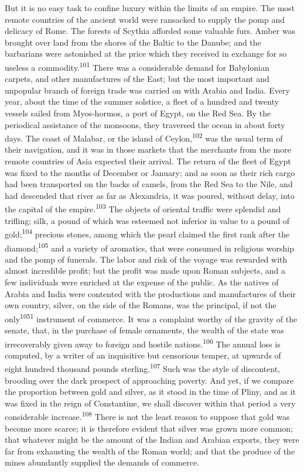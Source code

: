 But it is no easy task to confine luxury within the limits of an
empire. The most remote countries of the ancient world were
ransacked to supply the pomp and delicacy of Rome. The forests of
Scythia afforded some valuable furs. Amber was brought over land
from the shores of the Baltic to the Danube; and the barbarians
were astonished at the price which they received in exchange for
so useless a commodity.\textsuperscript{101} There was a considerable demand for
Babylonian carpets, and other manufactures of the East; but the
most important and unpopular branch of foreign trade was carried
on with Arabia and India. Every year, about the time of the
summer solstice, a fleet of a hundred and twenty vessels sailed
from Myos-hormos, a port of Egypt, on the Red Sea. By the
periodical assistance of the monsoons, they traversed the ocean
in about forty days. The coast of Malabar, or the island of
Ceylon,\textsuperscript{102} was the usual term of their navigation, and it was in
those markets that the merchants from the more remote countries
of Asia expected their arrival. The return of the fleet of Egypt
was fixed to the months of December or January; and as soon as
their rich cargo had been transported on the backs of camels,
from the Red Sea to the Nile, and had descended that river as far
as Alexandria, it was poured, without delay, into the capital of
the empire.\textsuperscript{103} The objects of oriental traffic were splendid and
trifling; silk, a pound of which was esteemed not inferior in
value to a pound of gold;\textsuperscript{104} precious stones, among which the
pearl claimed the first rank after the diamond;\textsuperscript{105} and a variety
of aromatics, that were consumed in religious worship and the
pomp of funerals. The labor and risk of the voyage was rewarded
with almost incredible profit; but the profit was made upon Roman
subjects, and a few individuals were enriched at the expense of
the public. As the natives of Arabia and India were contented
with the productions and manufactures of their own country,
silver, on the side of the Romans, was the principal, if not the
only\textsuperscript{1051} instrument of commerce. It was a complaint worthy of
the gravity of the senate, that, in the purchase of female
ornaments, the wealth of the state was irrecoverably given away
to foreign and hostile nations.\textsuperscript{106} The annual loss is computed,
by a writer of an inquisitive but censorious temper, at upwards
of eight hundred thousand pounds sterling.\textsuperscript{107} Such was the style
of discontent, brooding over the dark prospect of approaching
poverty. And yet, if we compare the proportion between gold and
silver, as it stood in the time of Pliny, and as it was fixed in
the reign of Constantine, we shall discover within that period a
very considerable increase.\textsuperscript{108} There is not the least reason to
suppose that gold was become more scarce; it is therefore evident
that silver was grown more common; that whatever might be the
amount of the Indian and Arabian exports, they were far from
exhausting the wealth of the Roman world; and that the produce of
the mines abundantly supplied the demands of commerce.


